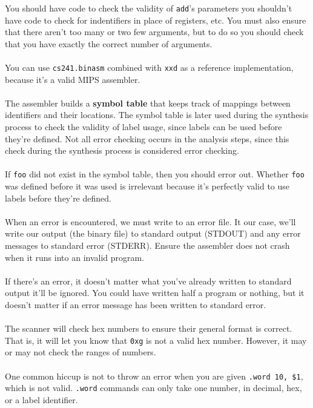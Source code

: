\documentclass[]{article}
\theoremstyle{definition}
\begin{document}
				You should have code to check the validity of \verb+add+'s parameters \textendash{} you shouldn't have code to check for indentifiers in place of registers, etc. You must also ensure that there aren't too many or two few arguments, but to do so you should check that you have exactly the correct number of arguments.
				\\ \\
				You can use \verb+cs241.binasm+ combined with \verb+xxd+ as a reference implementation, because it's a valid MIPS assembler.
				\\ \\
				The assembler builds a \textbf{symbol table} that keeps track of mappings between identifiers and their locations. The symbol table is later used during the synthesis process to check the validity of label usage, since labels can be used before they're defined. Not all error checking occurs in the analysis steps, since this check during the synthesis process is considered error checking.
				\\ \\
				If \verb+foo+ did not exist in the symbol table, then you should error out. Whether \verb+foo+ was defined before it was used is irrelevant because it's perfectly valid to use labels before they're defined.
				\\ \\
				When an error is encountered, we must write to an error file. It our case, we'll write our output (the binary file) to standard output (STDOUT) and any error messages to standard error (STDERR). Ensure the assembler does not crash when it runs into an invalid program.
				\\ \\
				If there's an error, it doesn't matter what you've already written to standard output \textendash{} it'll be ignored. You could have written half a program or nothing, but it doesn't matter if an error message has been written to standard error.
				\\ \\
				The scanner will check hex numbers to ensure their general format is correct. That is, it will let you know that \verb+0xg+ is not a valid hex number. However, it may or may not check the ranges of numbers.
				\\ \\
				One common hiccup is not to throw an error when you are given \verb+.word 10, $1+, which is not valid. \verb+.word+ commands can only take one number, in decimal, hex, or a label identifier.
\end{document}
